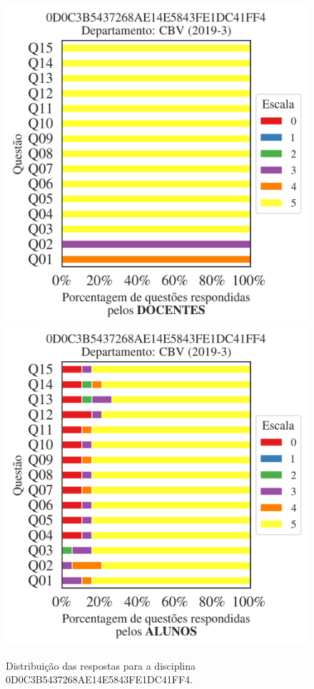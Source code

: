 \documentclass[a4paper,10pt]{article}
\begin{document}
\begin{figure}[h]
\centering
\includegraphics[width=0.485\linewidth]{analise_disciplina_departamento_CBV_0D0C3B5437268AE14E5843FE1DC41FF4_docentes.png}
\includegraphics[width=0.485\linewidth]{analise_disciplina_departamento_CBV_0D0C3B5437268AE14E5843FE1DC41FF4_alunos.png}
\caption{\label{fig:analise_geral_departamento}                Distribuição das respostas para a disciplina 0D0C3B5437268AE14E5843FE1DC41FF4. }
\end{figure}
\end{document}
